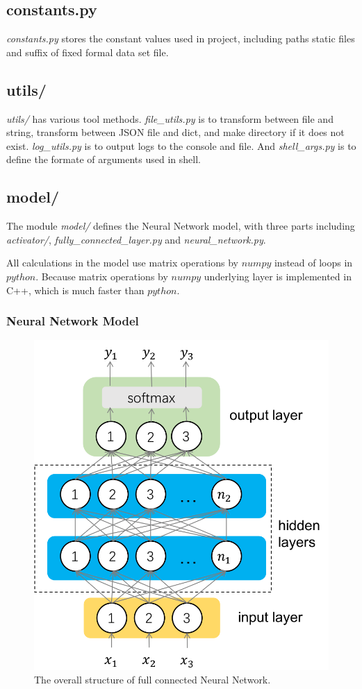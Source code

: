 \subsection{constants.py}
\textsl{constants.py} stores the constant values used in project, including paths static files and suffix of fixed formal data set file. 

\subsection{utils/}
\textsl{utils/} has various tool methods. \textsl{file\_utils.py} is to transform between file and string, transform between JSON file and dict, and make directory if it does not exist. \textsl{log\_utils.py} is to output logs to the console and file. And \textsl{shell\_args.py} is to define the formate of arguments used in shell.

\subsection{model/}
The module \textsl{model/} defines the Neural Network model, with three parts including \textsl{activator/}, \textsl{fully\_connected\_layer.py} and \textsl{neural\_network.py}. 

All calculations in the model use matrix operations by \(numpy\) instead of loops in \(python\). Because matrix operations by \(numpy\) underlying layer is implemented in C++, which is much faster than \(python\).

\subsubsection{Neural Network Model}
\begin{figure}[htbp]
	\centering
	\includegraphics[width = .4\textwidth]{images/dnn.png}
	\caption{The overall structure of full connected Neural Network.}
	\label{fig:dnn}
\end{figure}

